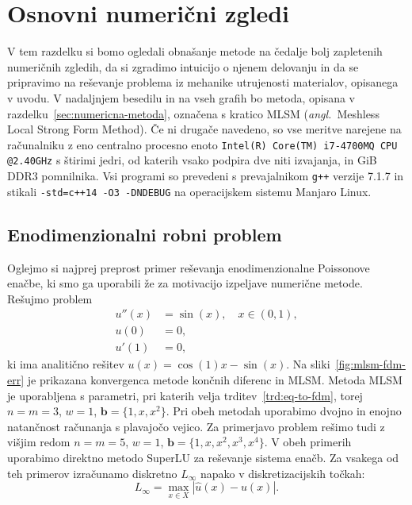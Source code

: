 \documentclass[12pt,a4paper,twoside]{article}
\theoremstyle{definition} %
\theoremstyle{plain} %
\numberwithin{equation}{section}
\renewcommand{\b}{\boldsymbol}
\newcommand{\ang}[1]{(\hspace{-1.5px}\textit{angl.}\ #1)}
\let\oldsection\section
\def\section{\cleardoublepage\oldsection}
\begin{document}
\section{Osnovni numerični zgledi}
\label{sec:osnovni-zgledi}
V tem razdelku si bomo ogledali obnašanje metode na čedalje bolj zapletenih numeričnih zgledih, da
si zgradimo intuicijo o njenem delovanju in da se pripravimo na reševanje problema iz mehanike
utrujenosti materialov, opisanega v uvodu. V nadaljnjem besedilu in na vseh grafih bo metoda,
opisana v razdelku~\ref{sec:numericna-metoda}, označena s kratico MLSM \ang{Meshless Local Strong
Form Method}. Če ni drugače navedeno, so vse meritve narejene na računalniku z eno centralno
procesno enoto \verb|Intel(R) Core(TM) i7-4700MQ CPU @2.40GHz| s štirimi jedri, od katerih vsako
podpira dve niti izvajanja, in \unit[16]{GiB} DDR3 pomnilnika. Vsi programi so prevedeni s
prevajalnikom \verb|g++| verzije 7.1.7 in stikali \verb|-std=c++14 -O3 -DNDEBUG| na operacijskem
sistemu Manjaro Linux.

\subsection{Enodimenzionalni robni problem}
Oglejmo si najprej preprost primer reševanja enodimenzionalne Poissonove enačbe, ki smo ga uporabili
že za motivacijo izpeljave numerične metode. Rešujmo problem
\begin{align}
  u''(x) &= \sin(x), \quad x \in (0, 1), \nonumber \\
  u(0) &= 0,  \\
  u'(1) &= 0, \nonumber
\end{align}
ki ima analitično rešitev $u(x) = \cos(1) x - \sin(x)$.
Na sliki~\ref{fig:mlsm-fdm-err} je prikazana konvergenca metode končnih diferenc
in MLSM. Metoda MLSM je uporabljena s parametri, pri katerih velja
trditev~\ref{trd:eq-to-fdm}, torej $n=m=3$, $w=1$, $\b b = \{1, x, x^2\}$.
Pri obeh metodah uporabimo dvojno in enojno natančnost računanja s plavajočo
vejico. Za primerjavo problem rešimo tudi z višjim redom $n=m=5$, $w=1$,
$\b b = \{1, x, x^2, x^3, x^4\}$. V obeh primerih uporabimo direktno metodo
SuperLU za reševanje sistema enačb. Za vsakega od teh primerov izračunamo
diskretno $L_\infty$ napako v diskretizacijskih točkah:
\begin{equation}
   L_\infty = \max_{x\in X} |\hat{u}(x) - u(x)|.
\end{equation}
\end{document}
